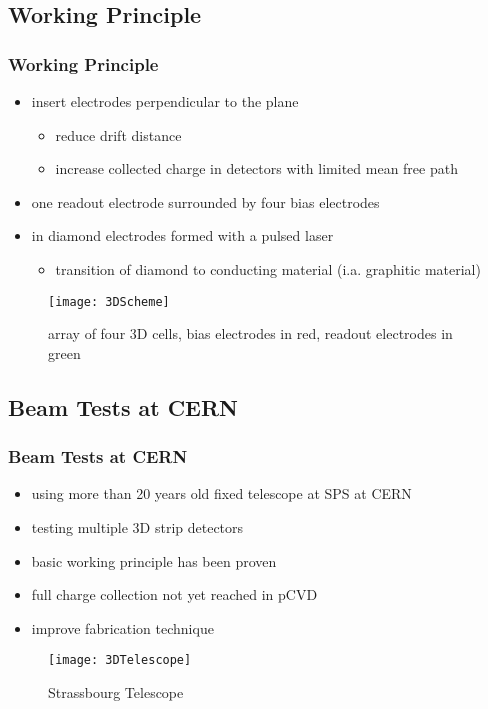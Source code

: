 \subsection{Working Principle}
\begin{frame}
	\frametitle{Working Principle}
	\begin{itemize}
		\setlength{\itemsep}{\fill}
		\item insert electrodes perpendicular to the plane
		\begin{itemize}
			\item reduce drift distance
			\item increase collected charge in detectors with limited mean free path %
		\end{itemize}
		\item one readout electrode surrounded by four bias electrodes
		\item in diamond electrodes formed with a pulsed laser
		\begin{itemize}
			\item transition of diamond to conducting material (i.a. graphitic material)
		\end{itemize}
	\end{itemize}
	\begin{figure}
		\centering
		\texttt{[image: 3DScheme]}
		\caption{array of four 3D cells, bias electrodes in red, readout electrodes in green}
	\end{figure}
\end{frame}
\subsection{Beam Tests at CERN}
\begin{frame}
	\frametitle{Beam Tests at CERN}
	\begin{itemize}
		\setlength{\itemsep}{\fill}
		\item using more than 20 years old fixed telescope at SPS at CERN
		\item testing multiple 3D strip detectors
		\item basic working principle has been proven
		\item full charge collection not yet reached in pCVD
		\item improve fabrication technique
	\end{itemize}
	\begin{figure}
		\centering
		\texttt{[image: 3DTelescope]}
		\caption{Strassbourg Telescope}
	\end{figure}
\end{frame}